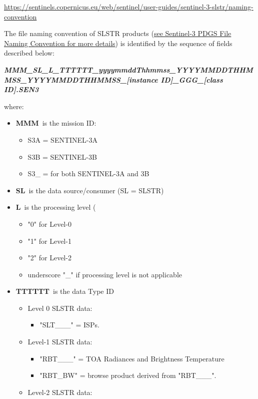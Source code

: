 \documentclass[sigplan,screen]{acmart}
\begin{document}
\url{https://sentinels.copernicus.eu/web/sentinel/user-guides/sentinel-3-slstr/naming-convention}

The file naming convention of SLSTR products
(\href{https://earth.esa.int/documents/247904/1964331/Sentinel-3_PDGS_File_Naming_Convention}{see
Sentinel-3 PDGS File Naming Convention for more details}) is identified
by the sequence of fields described below:

\emph{\textbf{MMM\_SL\_L\_TTTTTT\_yyyymmddThhmmss\_YYYYMMDDTHHMMSS\_YYYYMMDDTHHMMSS\_{[}instance
ID{]}\_GGG\_{[}class ID{]}.SEN3}}

where:

\begin{itemize}
\item
  \textbf{MMM}~is the mission ID:

  \begin{itemize}
  \item
    S3A = SENTINEL-3A
  \item
    S3B = SENTINEL-3B
  \item
    S3\_ = for both SENTINEL-3A and 3B
  \end{itemize}
\item
  \textbf{SL}~is the data source/consumer (SL = SLSTR)
\item
  \textbf{L}~is the processing level
(
  \begin{itemize}
  \item
    "0" for Level-0
  \item
    "1" for Level-1
  \item
    "2" for Level-2
  \item
    underscore "\_" if processing level is not applicable
  \end{itemize}
\item
  \textbf{TTTTTT}~is the data Type ID

  \begin{itemize}
  \item
    Level 0 SLSTR data:

    \begin{itemize}
    \item
      "SLT\_\_\_" = ISPs.
    \end{itemize}
  \item
    Level-1 SLSTR data:

    \begin{itemize}
    \item
      "RBT\_\_\_" = TOA Radiances and Brightness Temperature
    \item
      "RBT\_BW" = browse product derived from "RBT\_\_\_".
    \end{itemize}
  \item
    Level-2 SLSTR data:


\end{itemize}
\end{itemize}
\end{document}

